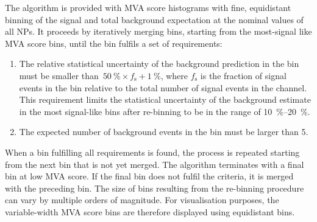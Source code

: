 The algorithm is provided with MVA score histograms with fine, equidistant
binning of the signal and total background expectation at the nominal values of
all NPs. It proceeds by iteratively merging bins, starting from the most-signal
like MVA score bins, until the bin fulfils a set of requirements:
\begin{enumerate}

\item The relative statistical uncertainty of the background prediction in the
  bin must be smaller
  than~\mbox{$\SI{50}{\percent} \times f_\text{s} + \SI{1}{\percent}$}, where
  $f_\text{s}$ is the fraction of signal events in the bin relative to the total
  number of signal events in the channel. This requirement limits the
  statistical uncertainty of the background estimate in the most signal-like
  bins after re-binning to be in the range of \SIrange{10}{20}{\percent}.

\item The expected number of background events in the bin must be larger than 5.

\end{enumerate}
When a bin fulfilling all requirements is found, the process is repeated
starting from the next bin that is not yet merged. The algorithm terminates with
a final bin at low MVA score. If the final bin does not fulfil the criteria, it
is merged with the preceding bin. The size of bins resulting from the re-binning
procedure can vary by multiple orders of magnitude. For visualisation purposes,
the variable-width MVA score bins are therefore displayed using equidistant
bins.




